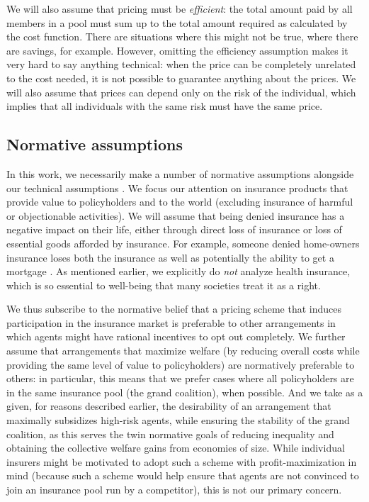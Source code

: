 \documentclass[sigconf]{acmart}
\begin{document}
We will also assume that pricing must be \emph{efficient}: the total amount paid by all members in a pool must sum up to the total amount required as calculated by the cost function. There are situations where this might not be true, where there are savings, for example. However, omitting the efficiency assumption makes it very hard to say anything technical: when the price can be completely unrelated to the cost needed, it is not possible to guarantee anything about the prices. We will also assume that prices can depend only on the risk of the individual, which implies that all individuals with the same risk must have the same price.

\subsection{Normative assumptions}
In this work, we necessarily make a number of normative assumptions alongside our technical assumptions \cite{cooper2020normative}. We focus our attention on insurance products that provide value to policyholders and to the world (excluding insurance of harmful or objectionable activities). We will assume that being denied insurance has a negative impact on their life, either through direct loss of insurance or loss of essential goods afforded by insurance. For example, someone denied home-owners insurance loses both the insurance as well as potentially the ability to get a mortgage \cite{heimer2002insuring}. As mentioned earlier, we explicitly do \emph{not} analyze health insurance, which is so essential to well-being that many societies treat it as a right.

 We thus subscribe to the normative belief that a pricing scheme that induces participation in the insurance market is preferable to other arrangements in which agents might have rational incentives to opt out completely. We further assume that arrangements that maximize welfare (by reducing overall costs while providing the same level of value to policyholders) are normatively preferable to others: in particular, this means that we prefer cases where all policyholders are in the same insurance pool (the grand coalition), when possible. And we take as a given, for reasons described earlier, the desirability of an arrangement that maximally subsidizes high-risk agents, while ensuring the stability of the grand coalition, as this serves the twin normative goals of reducing inequality and obtaining the collective welfare gains from economies of size. While individual insurers might be motivated to adopt such a scheme with profit-maximization in mind (because such a scheme would help ensure that agents are not convinced to join an insurance pool run by a competitor), this is not our primary concern.
\end{document}

